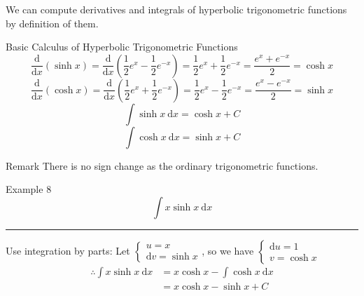 \documentclass[12pt,a4paper]{article}
\def\d{{\mathrm{d}}}
\begin{document}
We can compute derivatives and integrals of hyperbolic trigonometric functions by definition of them. 
\begin{thm}{Basic Calculus of Hyperbolic Trigonometric Functions}
	$$\frac{\d}{\d x}(\sinh{x})=\frac{\d}{\d x}\left(\frac{1}{2}e^x-\frac{1}{2}e^{-x}\right)=\frac{1}{2}e^x+\frac{1}{2}e^{-x}=\frac{e^x+e^{-x}}{2}=\cosh{x}$$
	$$\frac{\d}{\d x}(\cosh{x})=\frac{\d}{\d x}\left(\frac{1}{2}e^x+\frac{1}{2}e^{-x}\right)=\frac{1}{2}e^x-\frac{1}{2}e^{-x}=\frac{e^x-e^{-x}}{2}=\sinh{x}$$
	$$\int\sinh{x}\ \d x=\cosh{x}+C$$
	$$\int\cosh{x}\ \d x=\sinh{x}+C$$
	\begin{rmk}{Remark}
		There is no sign change as the ordinary trigonometric functions. 
	\end{rmk}
\end{thm}
\begin{eg}{Example 8}
	$$\int x\sinh{x}\ \d x$$
	\noindent\rule[0.25\baselineskip]{\textwidth}{1pt}
	Use integration by parts: Let $\begin{cases}u=x\\\d v=\sinh{x}\end{cases}$, so we have $\begin{cases}\d u=1\\v=\cosh x\end{cases}$
	$$\begin{aligned}
		\therefore \int x\sinh{x}\ \d x&=x\cosh{x}-\int\cosh{x}\ \d x\\
		&=x\cosh{x}-\sinh{x}+C
	\end{aligned}$$
\end{eg}
\end{document}
